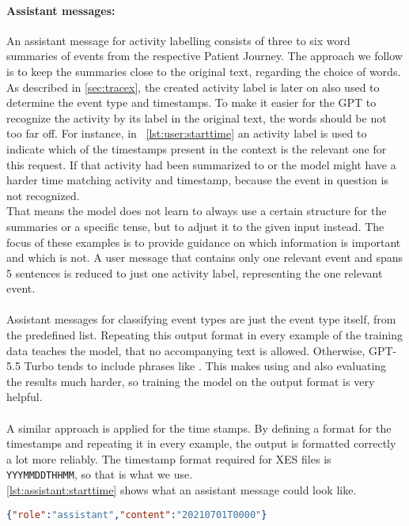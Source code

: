 \paragraph{Assistant messages:} An assistant message for activity labelling consists of three to six word summaries of events from the respective Patient Journey. The approach we follow is to keep the summaries close to the original text, regarding the choice of words. As described in \autoref{sec:tracex}, the created activity label is later on also used to determine the event type and timestamps. To make it easier for the GPT to recognize the activity by its label in the original text, the words should be not too far off. For instance, in ~\autoref{lst:user:starttime} an activity label is used to indicate which of the timestamps present in the context is the relevant one for this request. If that activity had been summarized to  or  the model might have a harder time matching activity and timestamp, because the event in question is not recognized.\\
That means the model does not learn to always use a certain structure for the summaries or a specific tense, but to adjust it to the given input instead. The focus of these examples is to provide guidance on which information is important and which is not. A user message that contains only one relevant event and spans 5 sentences is reduced to just one activity label, representing the one relevant event.\\\\
Assistant messages for classifying event types are just the event type itself, from the predefined list. Repeating this output format in every example of the training data teaches the model, that no accompanying text is allowed. Otherwise, GPT-5.5 Turbo tends to include phrases like . This makes using and also evaluating the results much harder, so training the model on the output format is very helpful. \\\\
A similar approach is applied for the time stamps. By defining a format for the timestamps and repeating it in every example, the output is formatted correctly a lot more reliably. The timestamp format required for XES files is \verb|YYYMMDDTHHMM|, so that is what we use.\\
\autoref{lst:assistant:starttime} shows what an assistant message could look like.
\begin{lstlisting}[language=json, caption={Assistant message for determining an acitivities start timestamp}, label={lst:assistant:starttime}]
{"role":"assistant","content":"20210701T0000"}
\end{lstlisting}

